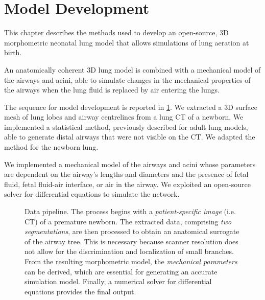 
\section{Model Development}
\label{sec:model_development}




This chapter describes the methods used to develop an open-source, 3D
morphometric neonatal lung model that allows simulations of lung
aeration at birth.

An anatomically coherent 3D lung model is combined with a mechanical
model of the airways and acini, able to simulate changes in the
mechanical properties of the airways when the lung fluid is replaced
by air entering the lungs.

The sequence for model development is reported in
\cref{fig:data_pipeline}. We extracted a 3D surface mesh of lung lobes
and airway centrelines from a lung CT of a newborn. We implemented a
statistical method, previously described for adult lung models, able
to generate distal airways that were not visible on the CT. We adapted
the method for the newborn lung.

We implemented a mechanical model of the airways and acini whose
parameters are dependent on the airway's lengths and diameters and the
presence of fetal fluid, fetal fluid-air interface, or air in the
airway. We exploited an open-source solver for differential equations
to simulate the network.

\begin{figure}[]\centering
  
  \caption{Data pipeline.  The process begins with a
    \emph{patient-specific image} (i.e. CT) of a premature newborn.
    The extracted data, comprising \emph{two segmentations}, are then
    processed to obtain an anatomical surrogate of the airway tree.
    This is necessary because scanner resolution does not allow for the
    discrimination and localization of small branches.  From the
    resulting morphometric model, the \emph{mechanical parameters} can
    be derived, which are essential for generating an accurate
    simulation model.  Finally, a numerical solver for differential
    equations provides the final output.}
  \label{fig:data_pipeline}
\end{figure}
  
